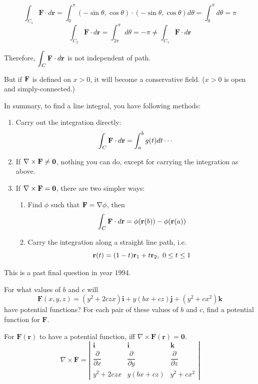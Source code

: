 \begin{spacing}{1.3}
    $$\int_{C_{1}} \mathbf{F} \cdot d \mathbf{r}=\int_{0}^{\pi}(-\sin \theta, \cos \theta) \cdot(-\sin \theta, \cos \theta) d \theta=\int_{0}^{\pi} d \theta=\pi$$
    $$\int_{C_{2}} \mathbf{F} \cdot d \mathbf{r}=\int_{2 \pi}^{\pi} d \theta=-\pi \neq \int_{C_{1}} \mathbf{F} \cdot d \mathbf{r}$$

    Therefore, $\displaystyle \int_{C} \mathbf{F} \cdot d \mathbf{r}$ is not independent of path.

    \vspace{0.3in}
    {\blue But if ${\bf F}$ is defined on $x>0$, it will become a conservative field. ($x>0$ is open and simply-connected.)}


    \newpage
    {\blue In summary, to find a line integral, you have following methods:}
    \begin{enumerate}
        \item Carry out the integration directly: 
        $$\int_C {\bf F}\cdot d{\bf r}=\int_a^b g(t) dt\cdots$$
        \item If $\nabla \times {\bf F} \ne {\bf 0}$, nothing you can do, except for 
        carrying the integration as above.
        \item If $\nabla \times {\bf F} = {\bf 0}$, there are two simpler ways:
        \begin{enumerate}
            \item Find $\phi$ such that ${\bf F} =\nabla \phi$, then 
            $$\int_C {\bf F} \cdot d{\bf r}=\phi ({\bf r}(b))-\phi ({\bf r}(a))$$
            \item Carry the integration along a straight line path, i.e. 
            $${\bf r}(t)=(1-t){\bf r}_1+t{\bf r}_2,\ 0\le t\le 1$$
        \end{enumerate}
    \end{enumerate}

    \newpage
    {\blue This is a past final question in year 1994.}

    \eg For what values of $b$ and $c$ will
    $$\mathbf{F}(x, y, z)=\left(y^{2}+2 c z x\right) \mathbf{i}+y(b x+c z) \mathbf{j}+\left(y^{2}+c x^{2}\right) \mathbf{k}$$
    have potential functions? For each pair of these values of $b$ and $c$, find a potential function for $\mathbf{F}$.

    \sol 
    For $\mathbf{F}(\mathbf{r})$ to have a potential function, iff $\nabla \times \mathbf{F}(\mathbf{r})=\mathbf{0}$.
    $$\nabla \times \mathbf{F}=\left|\begin{array}{ccc}
        \mathbf{i} & \mathbf{i} & \mathbf{k} \\
        \dfrac{\partial}{\partial x} & \dfrac{\partial}{\partial y} & \dfrac{\partial}{\partial z} \\
        y^{2}+2 c z x & y(b x+c z) & y^{2}+c x^{2}
    \end{array}\right|$$


\end{spacing}
